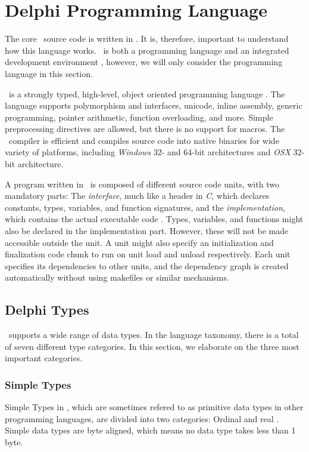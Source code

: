 \section{Delphi Programming Language}
\label{sec:Delphi Programming Language}
The core \gap~source code is written in \delphi. It is, therefore, important to understand how this language works. \delphi~is both a programming language and an integrated development environment \cite{Wikipedia_contributors2016-jk}, however, we will only consider the programming language in this section.

\delphi~is a strongly typed, high-level, object oriented programming language \cite{noauthor_undated-cn, Wikipedia_contributors2016-jk}. The language supports polymorphism and interfaces, unicode, inline assembly, generic programming, pointer arithmetic, function overloading, and more. Simple preprocessing directives are allowed, but there is no support for macros. The \delphi~compiler is efficient and compiles source code into native binaries for wide variety of platforms, including \textit{Windows} 32- and 64-bit architectures and \textit{OSX} 32-bit architecture.

A program written in \delphi~is composed of different source code units, with two mandatory parts: The \textit{interface}, much like a header in \textit{C}, which declares constants, types, variables, and function signatures, and the \textit{implementation}, which contains the actual executable code \cite{noauthor_undated-pl}. Types, variables, and functions might also be declared in the implementation part. However, these will not be made accessible outside the unit. A unit might also specify an initialization and finalization code chunk to run on unit load and unload respectively. Each unit specifies its dependencies to other units, and the dependency graph is created automatically without using makefiles or similar mechanisms.

\subsection{Delphi Types}
\label{sub:Delphi Types}
\delphi~supports a wide range of data types. In the language taxonomy, there is a total of seven different type categories. In this section, we elaborate on the three most important categories.

\subsubsection{Simple Types}
\label{ssub:Simple Types}
Simple Types in \delphi, which are sometimes refered to as primitive data types in other programming languages, are divided into two categories: Ordinal and real \cite{noauthor_undated-st}. Simple data types are byte aligned, which means no data type takes less than 1 byte.

